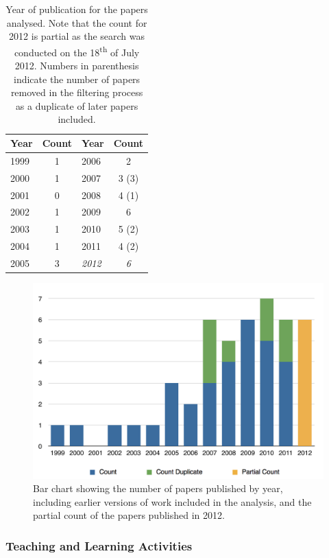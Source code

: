 \begin{table}[p]
	\centering
	\caption{Year of publication for the papers analysed. Note that the count for 2012 is partial as the search was conducted on the 18\textsuperscript{th} of July 2012. Numbers in parenthesis indicate the number of papers removed in the filtering process as a duplicate of later papers included. }
	\label{tbl:year}
	\footnotesize
    \begin{tabular}{lc||lc}
    \textbf{Year} & \textbf{Count} & \textbf{Year} & \textbf{Count} \\ \hline
		1999	&	1	& 		2006	&	2		\\
		2000	&	1	& 		2007	&	3 (3)	\\
		2001	&	0	& 		2008	&	4 (1)	\\
		2002	&	1	& 		2009	&	6		\\
		2003	&	1	& 		2010	&	5 (2)	\\
		2004	&	1	& 		2011	&	4 (2)	\\
		2005	&	3	& 		\emph{2012}	&	\emph{6}	\\
    \end{tabular}
\end{table}

\begin{figure}[p]
	\centering
	\includegraphics[width=\textwidth]{Year}
	\caption{Bar chart showing the number of papers published by year, including earlier versions of work included in the analysis, and the partial count of the papers published in 2012.}
	\label{fig:year}
\end{figure}


\subsubsection{Teaching and Learning Activities} %
\label{sub:teaching_and_learning_activities}


